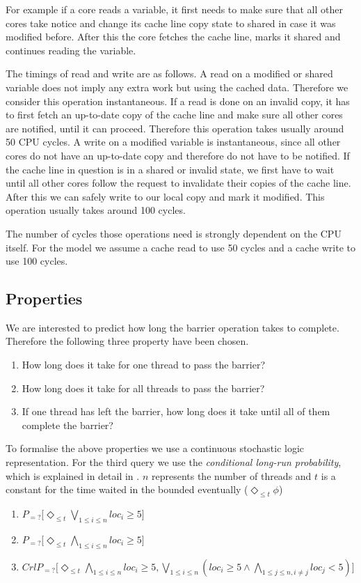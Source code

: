 \documentclass[a4paper, 10pt]{article}
\begin{document}
For example if a core reads a variable, it first needs to make sure that all other cores take notice and change its cache line copy state to shared in case it was modified before. After this the core fetches the cache line, marks it shared and continues reading the variable.

The timings of read and write are as follows. A read on a modified or shared variable does not imply any extra work but using the cached data. Therefore we consider this operation instantaneous. If a read is done on an invalid copy, it has to first fetch an up-to-date copy of the cache line and make sure all other cores are notified, until it can proceed. Therefore this operation takes usually around 50 CPU cycles. A write on a modified variable is instantaneous, since all other cores do not have an up-to-date copy and therefore do not have to be notified. If the cache line in question is in a shared or invalid state, we first have to wait until all other cores follow the request to invalidate their copies of the  cache line. After this we can safely write to our local copy and mark it modified. This operation usually takes around 100 cycles.

The number of cycles those operations need is strongly dependent on the CPU itself. For the model we assume a cache read to use 50 cycles and a cache write to use 100 cycles.
\subsection{Properties}
We are interested to predict how long the barrier operation takes to complete. Therefore the following three property have been chosen.
\begin{enumerate}
	\item How long does it take for one thread to pass the barrier?
	\item How long does it take for all threads to pass the barrier?
	\item If one thread has left the barrier, how long does it take until all of them complete the barrier?
\end{enumerate}

To formalise the above properties we use a continuous stochastic logic\cite{assb96}\cite{bkh99} representation. For the third query we use the \emph{conditional long-run probability}, which is explained in detail in \cite{fmix}. $n$ represents the number of threads and $t$ is a constant for the time waited in the bounded eventually ($\Diamond_{\le t} \phi$)
\begin{enumerate}
	\item $P_{=?} \big[\Diamond_{\le t} \bigvee_{1 \le i \le n} loc_i \ge 5\big]$
	\item $P_{=?} \big[\Diamond_{\le t} \bigwedge_{1 \le i \le n} loc_i \ge 5\big]$
	\item $CrlP_{=?} \big[\Diamond_{\le t} \bigwedge_{1 \le i \le n} loc_i \ge 5, \bigvee_{1 \le i \le n} (loc_i \ge 5 \wedge \bigwedge_{1 \le j \le n, i \neq j} loc_j < 5)\big]$
\end{enumerate}
\end{document}

